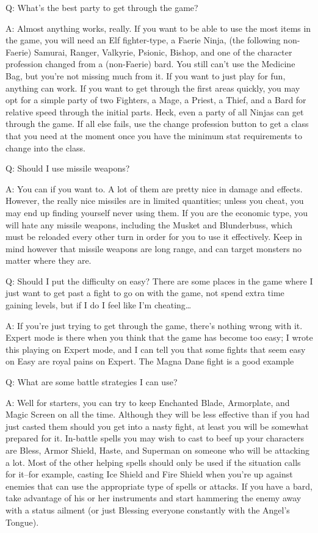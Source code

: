 \documentclass[12pt]{article}
\begin{document}
Q: What's the best party to get through the game?

A: Almost anything works, really. If you want to be able to use the most
items in the game, you will need an Elf fighter-type, a Faerie Ninja,
(the following non-Faerie) Samurai, Ranger, Valkyrie, Psionic, Bishop,
and one of the character profession changed from a (non-Faerie) bard.
You still can't use the Medicine Bag, but you're not missing much from
it. If you want to just play for fun, anything can work. If you want to
get through the first areas quickly, you may opt for a simple party of
two Fighters, a Mage, a Priest, a Thief, and a Bard for relative speed
through the initial parts. Heck, even a party of all Ninjas can get
through the game. If all else fails, use the change profession button to
get a class that you need at the moment once you have the minimum stat
requirements to change into the class.

Q: Should I use missile weapons?

A: You can if you want to. A lot of them are pretty nice in damage and
effects. However, the really nice missiles are in limited quantities;
unless you cheat, you may end up finding yourself never using them. If
you are the economic type, you will hate any missile weapons, including
the Musket and Blunderbuss, which must be reloaded every other turn in
order for you to use it effectively. Keep in mind however that missile
weapons are long range, and can target monsters no matter where they
are.

Q: Should I put the difficulty on easy? There are some places in the
game where I just want to get past a fight to go on with the game, not
spend extra time gaining levels, but if I do I feel like I'm
cheating\ldots{}

A: If you're just trying to get through the game, there's nothing wrong
with it. Expert mode is there when you think that the game has become
too easy; I wrote this playing on Expert mode, and I can tell you that
some fights that seem easy on Easy are royal pains on Expert. The Magna
Dane fight is a good example

Q: What are some battle strategies I can use?

A: Well for starters, you can try to keep Enchanted Blade, Armorplate,
and Magic Screen on all the time. Although they will be less effective
than if you had just casted them should you get into a nasty fight, at
least you will be somewhat prepared for it. In-battle spells you may
wish to cast to beef up your characters are Bless, Armor Shield, Haste,
and Superman on someone who will be attacking a lot. Most of the other
helping spells should only be used if the situation calls for it--for
example, casting Ice Shield and Fire Shield when you're up against
enemies that can use the appropriate type of spells or attacks. If you
have a bard, take advantage of his or her instruments and start
hammering the enemy away with a status ailment (or just Blessing
everyone constantly with the Angel's Tongue).
\end{document}
